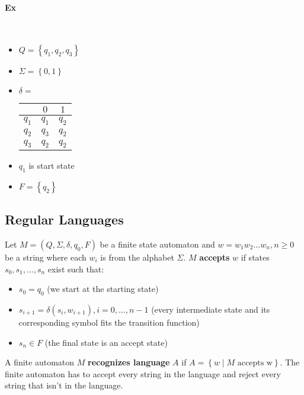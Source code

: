 \documentclass[12 pt]{article}
\begin{document}
\paragraph{Ex}~\\
\begin{itemize}
\item $Q = \left\{q_1, q_2, q_3\right\}$
\item $\Sigma = \left\{0,1\right\}$
\item $\delta = $
  \begin{tabular}{c | c c}
    &$0$&$1$
    \\ \hline $q_1$ & $q_1$ & $q_2$
    \\ $q_2$ & $q_3$ & $q_2$
    \\ $q_3$ & $q_2$ & $q_2$
  \end{tabular}
\item $q_1$ is start state
\item $F = \left\{q_2\right\}$
\end{itemize}
\subsection{Regular Languages} Let $M = (Q, \Sigma, \delta, q_0, F)$
be a finite state automaton and $w = w_1w_2\ldots w_n, n \geq 0$ be a
string where each $w_i$ is from the alphabet $\Sigma$. $M$
\textbf{accepts} $w$ if states $s_0,s_1, \ldots, s_n$ exist such that:
\begin{itemize}
\item $s_0=q_0$ (we start at the starting state)
\item $s_{i+1} = \delta(s_i, w_{i+1}), i = 0, \ldots, n-1$ (every
  intermediate state and its corresponding symbol fits the transition function)
\item $s_n \in F$ (the final state is an accept state)
\end{itemize}
A finite automaton $M$ \textbf{recognizes language} $A$ if $A =
\left\{w \mid M \text{ accepts w}\right\}$. The finite automaton has
to accept every string in the language and reject every string that
isn't in the language.
\end{document}
